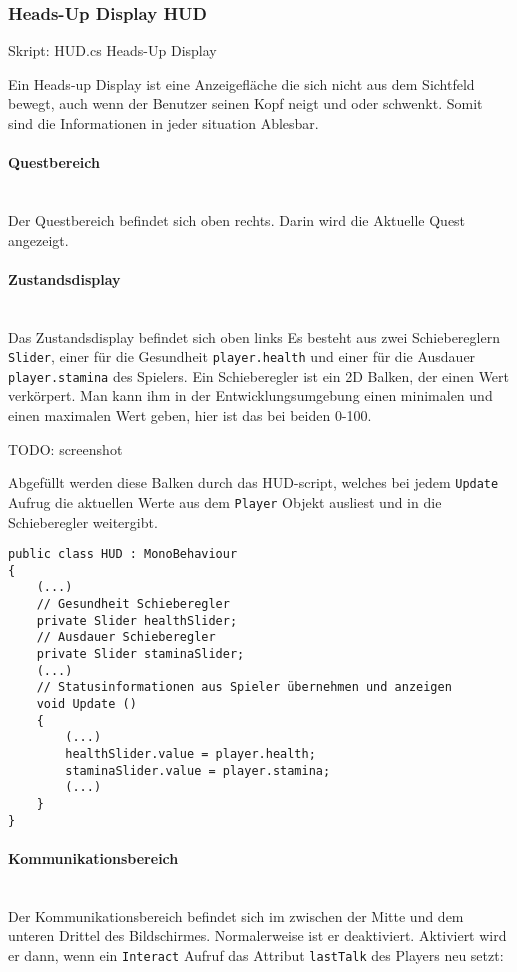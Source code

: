 \subsubsection{Heads-Up Display HUD}
Skript: HUD.cs
Heads-Up Display

Ein Heads-up Display ist eine Anzeigefläche die sich nicht aus dem Sichtfeld bewegt, auch wenn der Benutzer seinen Kopf neigt und oder schwenkt.
Somit sind die Informationen in jeder situation Ablesbar.
 
\paragraph{Questbereich}\mbox{} \\
Der Questbereich befindet sich oben rechts.
Darin wird die Aktuelle Quest angezeigt.

\paragraph{Zustandsdisplay}\mbox{} \\
Das Zustandsdisplay befindet sich oben links 
Es besteht aus zwei Schiebereglern \lstinline{Slider}, einer für die Gesundheit \lstinline{player.health} und einer für die Ausdauer \lstinline{player.stamina} des Spielers.
Ein Schieberegler ist ein 2D Balken, der einen Wert verkörpert. Man kann ihm in der Entwicklungsumgebung einen minimalen und einen maximalen Wert geben, hier ist das bei beiden 0-100.

TODO: screenshot

Abgefüllt werden diese Balken durch das HUD-script, welches bei jedem \lstinline{Update} Aufrug die aktuellen Werte aus dem \lstinline{Player} Objekt ausliest und in die Schieberegler weitergibt.

\begin{lstlisting}[caption={Schieberegler erstellen}]
public class HUD : MonoBehaviour
{
	(...)
	// Gesundheit Schieberegler
	private Slider healthSlider;
	// Ausdauer Schieberegler
	private Slider staminaSlider;
	(...)
	// Statusinformationen aus Spieler übernehmen und anzeigen
	void Update ()
	{
		(...)
		healthSlider.value = player.health;
		staminaSlider.value = player.stamina;
		(...)
	}
}
\end{lstlisting}

\paragraph{Kommunikationsbereich}\mbox{} \\
Der Kommunikationsbereich befindet sich im zwischen der Mitte und dem unteren Drittel des Bildschirmes.
Normalerweise ist er deaktiviert.
Aktiviert wird er dann, wenn ein \lstinline{Interact} Aufruf das Attribut \lstinline{lastTalk} des Players neu setzt:

